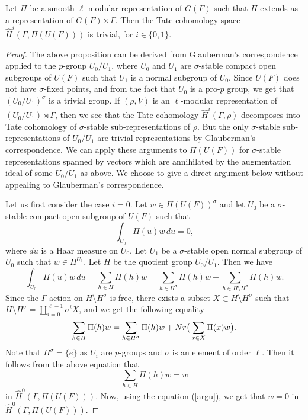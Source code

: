 \documentclass[10pt,a4paper]{amsart}
\begin{document}
\begin{proposition}\label{prop}
  Let $\Pi$ be a smooth $\ell$-modular representation of $G(F)$ such
  that $\Pi$ extends as a representation of $G(F)\rtimes \Gamma$. Then
  the Tate cohomology space $\widehat{H}^i(\Gamma, \Pi(U(F)))$ is
  trivial, for $i\in \{0,1\}$.
\end{proposition}

\begin{proof}
  The above proposition can be derived from Glauberman's
  correspondence applied to the $p$-group $U_0/U_1$, where $U_0$ and
  $U_1$ are $\sigma$-stable compact open subgroups of $U(F)$ such that
  $U_1$ is a normal subgroup of $U_0$. Since $U(F)$ does not have
  $\sigma$-fixed points, and from the fact that $U_0$ is a pro-$p$
  group, we get that $(U_0/U_1)^\sigma$ is a trivial group.  If
  $(\rho, V)$ is an $\ell$-modular representation of
  $(U_0/U_1)\rtimes \Gamma$, then we see that the Tate cohomology
  $\widehat{H}^i(\Gamma, \rho)$ decomposes into Tate cohomology of
  $\sigma$-stable sub-representations of $\rho$. But the only
  $\sigma$-stable sub-representations of $U_0/U_1$ are trivial
  representations by Glauberman's correspondence. We can apply these
  arguments to $\Pi(U(F))$ for $\sigma$-stable representations spanned
  by vectors which are annihilated by the augmentation ideal of some
  $U_0/U_1$ as above. We choose to give a direct argument below
  without appealing to Glauberman's correspondence.

Let us first consider the case $i=0$.
Let $w\in \Pi(U(F))^\sigma$ and let $U_0$ be a $\sigma$-stable
 compact open subgroup of $U(F)$
 such that 
 \begin{equation}\label{argu}
\int_{U_0}\Pi(u)w\,du=0,
 \end{equation}
 where $du$ is a Haar measure on $U_0$. Let $U_1$ be a $\sigma$-stable
 open normal subgroup of $U_0$ such that $w\in \Pi^{U_1}$. Let $H$ be
 the quotient group $U_0/U_1$. Then we have
$$ \int_{U_0}\Pi(u)w\,du = \sum_{h\in H} \Pi(h)w = \sum_{h\in H^\sigma} \Pi(h)w +
\sum_{h\in H\setminus H^\sigma} \Pi(h)w. $$ Since the $\Gamma$-action
on $H\setminus H^\sigma$ is free, there exists a subset
$X\subset H\setminus H^\sigma$ such that
$H\setminus H^\sigma = \coprod_{i=0}^{\ell-1}\sigma^iX$, and we get
the following equality
$$
\sum_{h\in H} \Pi(h)w = \sum_{h\in H^\sigma} \Pi(h)w + {\rm
  Nr}\big(\sum_{x\in X}\Pi(x)w\big).
$$
Note that $H^\sigma = \{e\}$ as $U_i$ are $p$-groups and $\sigma$ is
an element of order $\ell$. Then it follows from the above equation
that
$$ \sum_{h\in H} \Pi(h)w = w $$
in $\widehat{H}^0(\Gamma, \Pi(U(F)))$. Now, using the equation
(\ref{argu}), we get that $w=0$ in $\widehat{H}^0(\Gamma,\Pi(U(F)))$.


\end{proof}
\end{document}
